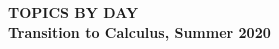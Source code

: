 \documentclass[11pt]{exam}
\begin{document}



\vfill
\newpage

\begin{center}
\textbf{\large TOPICS BY DAY}\\[2.5pt]
\textbf{Transition to Calculus, Summer 2020}
\end{center}
\end{document}
